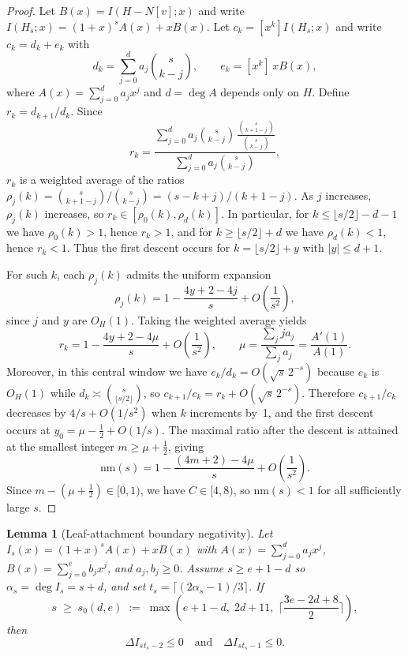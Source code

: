 \documentclass[12pt,oneside]{article}
\newtheorem{lemma}{Lemma}
\theoremstyle{remark}
\newcommand{\nm}{\mathrm{nm}}             %
\begin{document}
\begin{proof}
Let $B(x) = I(H - N[v]; x)$ and write
$I(H_s; x) = (1+x)^s A(x) + x B(x)$.
Let $c_k = [x^k] I(H_s; x)$ and write $c_k = d_k + e_k$ with
\[
  d_k = \sum_{j=0}^{d} a_j \binom{s}{k-j}, \qquad
  e_k = [x^k]\, x B(x),
\]
where $A(x)=\sum_{j=0}^d a_j x^j$ and $d = \deg A$ depends only on $H$.
Define $r_k = d_{k+1}/d_k$.
Since
\[
  r_k
  = \frac{\sum_{j=0}^d a_j \binom{s}{k-j} \,\frac{\binom{s}{k+1-j}}{\binom{s}{k-j}}}
         {\sum_{j=0}^d a_j \binom{s}{k-j}},
\]
$r_k$ is a weighted average of the ratios
$\rho_j(k) = \binom{s}{k+1-j}/\binom{s}{k-j} = (s-k+j)/(k+1-j)$.
As $j$ increases, $\rho_j(k)$ increases, so $r_k \in [\rho_0(k), \rho_d(k)]$.
In particular, for $k \le \lfloor s/2 \rfloor - d - 1$ we have $\rho_0(k) > 1$, hence $r_k > 1$,
and for $k \ge \lfloor s/2 \rfloor + d$ we have $\rho_d(k) < 1$, hence $r_k < 1$.
Thus the first descent occurs for $k = \lfloor s/2 \rfloor + y$ with $|y| \le d+1$.

For such $k$, each $\rho_j(k)$ admits the uniform expansion
\[
  \rho_j(k) = 1 - \frac{4y + 2 - 4j}{s} + O\!\left(\frac{1}{s^2}\right),
\]
since $j$ and $y$ are $O_H(1)$. Taking the weighted average yields
\[
  r_k = 1 - \frac{4y + 2 - 4\mu}{s} + O\!\left(\frac{1}{s^2}\right),
  \qquad \mu = \frac{\sum_j j a_j}{\sum_j a_j} = \frac{A'(1)}{A(1)}.
\]
Moreover, in this central window we have $e_k/d_k = O(\sqrt{s}\,2^{-s})$ because
$e_k$ is $O_H(1)$ while $d_k \asymp \binom{s}{\lfloor s/2 \rfloor}$, so
$c_{k+1}/c_k = r_k + O(\sqrt{s}\,2^{-s})$.
Therefore $c_{k+1}/c_k$ decreases by $4/s + O(1/s^2)$ when $k$ increments by~1,
and the first descent occurs at $y_0 = \mu - \tfrac{1}{2} + O(1/s)$.
The maximal ratio after the descent is attained at the smallest integer
$m \ge \mu + \tfrac{1}{2}$, giving
\[
  \nm(s) = 1 - \frac{(4m + 2) - 4\mu}{s} + O\!\left(\frac{1}{s^2}\right).
\]
Since $m - (\mu + \tfrac{1}{2}) \in [0, 1)$, we have $C \in [4, 8)$, so
$\nm(s) < 1$ for all sufficiently large $s$.
\end{proof}

\begin{lemma}[Leaf-attachment boundary negativity]\label{lem:leaf-attach-boundary}
Let $I_s(x) = (1+x)^s A(x) + x B(x)$ with $A(x)=\sum_{j=0}^d a_j x^j$,
$B(x)=\sum_{j=0}^e b_j x^j$, and $a_j,b_j \ge 0$.
Assume $s \ge e+1-d$ so $\alpha_s=\deg I_s = s+d$, and set
$t_s=\lceil(2\alpha_s-1)/3\rceil$.
If
\[
  s \;\ge\; s_0(d,e) \;:=\; \max\!\left(e+1-d,\; 2d+11,\; \Big\lceil\frac{3e-2d+8}{2}\Big\rceil\right),
\]
then
\[
  \Delta I_s{}_{t_s-2} \le 0
  \quad\text{and}\quad
  \Delta I_s{}_{t_s-1} \le 0.
\]
\end{lemma}
\end{document}

